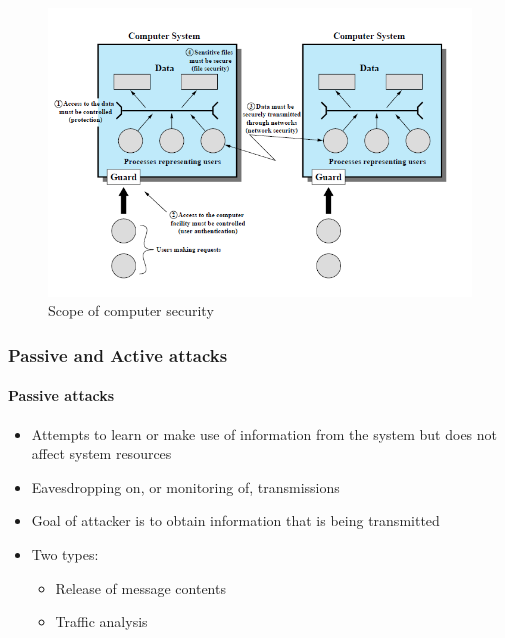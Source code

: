 \documentclass{article}
\begin{document}
                    \begin{figure}[h]
                        \begin{center}
                            \includegraphics{../immagini/scope_computer_security.png}
                            \caption{Scope of computer security}\footnotemark
                        \end{center}
                    \end{figure}
            \newpage
            \subsubsection{Passive and Active attacks}
                    \paragraph{Passive attacks}
                    \begin{itemize}
                        \item Attempts to learn or make use of information from the system but does not affect system resources
                        \item Eavesdropping on, or monitoring of, transmissions
                        \item Goal of attacker is to obtain information that is being transmitted
                        \item Two types:
                        \begin{itemize}
                            \item Release of message contents
                            \item Traffic analysis
                        \end{itemize}
                    \end{itemize}
\end{document}
